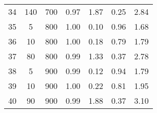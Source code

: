 \documentclass[11pt]{article}
\begin{document}
\begin{table}[]
\begin{tabular}{ccccccc}
			\rowcolor[HTML]{EFEFEF} 
			34 & 140 & 700 & 0.97 & 1.87 & 0.25 & 2.84 \\
			35 & 5 & 800 & 1.00 & 0.10 & 0.96 & 1.68 \\ 
			36 & 10 & 800 & 1.00 & 0.18 & 0.79 & 1.79 \\ 
			37 & 80 & 800 & 0.99 & 1.33 & 0.37 & 2.78 \\ 
			\rowcolor[HTML]{EFEFEF} 
			38 & 5 & 900 & 0.99 & 0.12 & 0.94 & 1.79 \\ 
			\rowcolor[HTML]{EFEFEF} 
			39 & 10 & 900 & 1.00 & 0.22 & 0.81 & 1.95 \\ 
			\rowcolor[HTML]{EFEFEF} 
			40 & 90 & 900 & 0.99 & 1.88 & 0.37 & 3.10 \\ 
		\end{tabular}
	\end{table}
\end{document}
